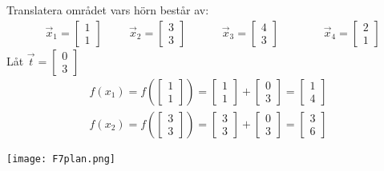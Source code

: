 \begin{Ex}
    Translatera området vars hörn består av:
    \begin{align*}
    &\vec{x}_1 = \begin{bmatrix} 1\\1 \end{bmatrix}
    &&&\vec{x}_2 = \begin{bmatrix} 3\\3 \end{bmatrix}
    &&&&\vec{x}_3 = \begin{bmatrix} 4\\3 \end{bmatrix}
    &&&&&\vec{x}_4 = \begin{bmatrix} 2\\1 \end{bmatrix}
    \end{align*}
    Låt $\vec{t} = \begin{bmatrix} 0\\3 \end{bmatrix}$
    \begin{gather*}
    	f(x_1) = f(\begin{bmatrix} 1\\1 \end{bmatrix}) = \begin{bmatrix} 1\\1 \end{bmatrix} + \begin{bmatrix} 0\\3 \end{bmatrix} = \begin{bmatrix} 1\\4 \end{bmatrix}\\
    	f(x_2) = f(\begin{bmatrix} 3\\3 \end{bmatrix}) = \begin{bmatrix} 3\\3 \end{bmatrix} + \begin{bmatrix} 0\\3 \end{bmatrix} = \begin{bmatrix} 3\\6 \end{bmatrix}
    \end{gather*}
    \begin{center}
    	\texttt{[image: F7plan.png]}
    \end{center}
\end{Ex}
\newpage
